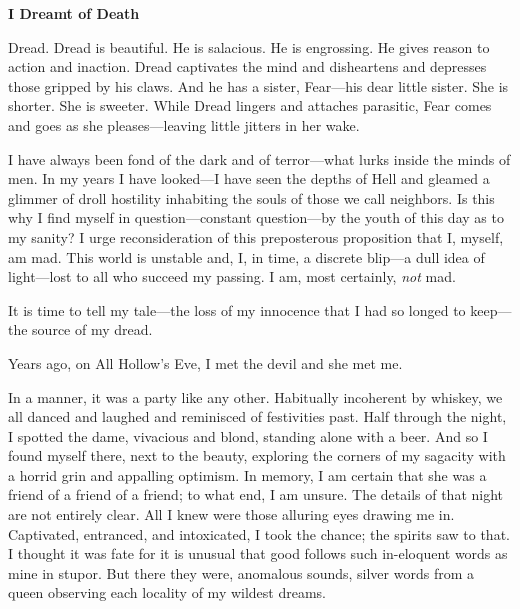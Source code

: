 \documentclass{article}
\begin{document}


\begin{center}
\large\textbf{I Dreamt of Death}
\end{center}



\noindent
Dread.
Dread is beautiful.  He is salacious.  He is engrossing.
He gives reason to action and inaction.
Dread captivates the mind and disheartens and depresses
those gripped by his claws.
And he has a sister, Fear---his dear little sister.
She is shorter.  She is sweeter.
While Dread lingers and attaches parasitic,
Fear comes and goes as she pleases---leaving
little jitters in her wake.


I have always been fond of the dark and of terror---what
lurks inside the minds of men. In my years
I have looked---I have seen the depths of Hell
and gleamed a glimmer of droll hostility
inhabiting the souls of those we call neighbors.
Is this why I find myself in question---constant question---by
the youth of this day as to my sanity?
I urge reconsideration of this preposterous proposition that
I, myself, am mad.
This world is unstable and, I, in time, a discrete blip---a
dull idea of light---lost to all who succeed my passing.
I am, most certainly, \textit{not} mad.
\VV


\noindent %
It is time to tell my tale---the
loss of my innocence that I had so longed to keep---the
source of my dread.
\VV


\noindent
Years ago, on All Hollow's Eve,
I met the devil and she met me.
\VV


\noindent
In a manner, it was a party like any other.
Habitually incoherent by whiskey,
we all danced and laughed and reminisced of festivities past.
Half through the night, I spotted the dame,
vivacious and blond, standing alone with a beer.
And so I found myself there, next to the beauty,
exploring the corners of my sagacity with a horrid
grin and appalling optimism.
In memory, I am certain that she was a friend of
a friend of a friend; to what end, I am unsure.
The details of that night are not entirely clear.
All I knew were those alluring eyes drawing me in.
Captivated, entranced, and intoxicated,
I took the chance; the spirits saw to that.
I thought it was fate for it is unusual
that good follows such in-eloquent words
as mine in stupor.
But there they were, anomalous sounds,
silver words from a queen observing each
locality of my wildest dreams.
\end{document}
